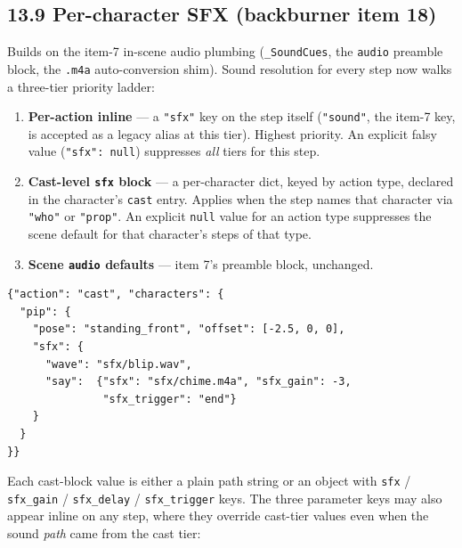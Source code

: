 \documentclass[
  11pt,
]{book}
\begin{document}
\subsection{\texorpdfstring{13.9 Per-character SFX (backburner item 18)}{13.9 Per-character SFX}}\label{per-character-sfx}

Builds on the item-7 in-scene audio plumbing (\texttt{\_SoundCues},
the \texttt{audio} preamble block, the \texttt{.m4a} auto-conversion
shim). Sound resolution for every step now walks a three-tier
priority ladder:

\begin{enumerate}
\item
  \textbf{Per-action inline} --- a \texttt{"sfx"} key on the step
  itself (\texttt{"sound"}, the item-7 key, is accepted as a legacy
  alias at this tier). Highest priority. An explicit falsy value
  (\texttt{"sfx": null}) suppresses \emph{all} tiers for this step.
\item
  \textbf{Cast-level \texttt{sfx} block} --- a per-character dict,
  keyed by action type, declared in the character's \texttt{cast}
  entry. Applies when the step names that character via \texttt{"who"}
  or \texttt{"prop"}. An explicit \texttt{null} value for an action
  type suppresses the scene default for that character's steps of
  that type.
\item
  \textbf{Scene \texttt{audio} defaults} --- item 7's preamble block,
  unchanged.
\end{enumerate}

\begin{verbatim}
{"action": "cast", "characters": {
  "pip": {
    "pose": "standing_front", "offset": [-2.5, 0, 0],
    "sfx": {
      "wave": "sfx/blip.wav",
      "say":  {"sfx": "sfx/chime.m4a", "sfx_gain": -3,
               "sfx_trigger": "end"}
    }
  }
}}
\end{verbatim}

Each cast-block value is either a plain path string or an object with
\texttt{sfx} / \texttt{sfx\_gain} / \texttt{sfx\_delay} /
\texttt{sfx\_trigger} keys. The three parameter keys may also appear
inline on any step, where they override cast-tier values even when
the sound \emph{path} came from the cast tier:
\end{document}
